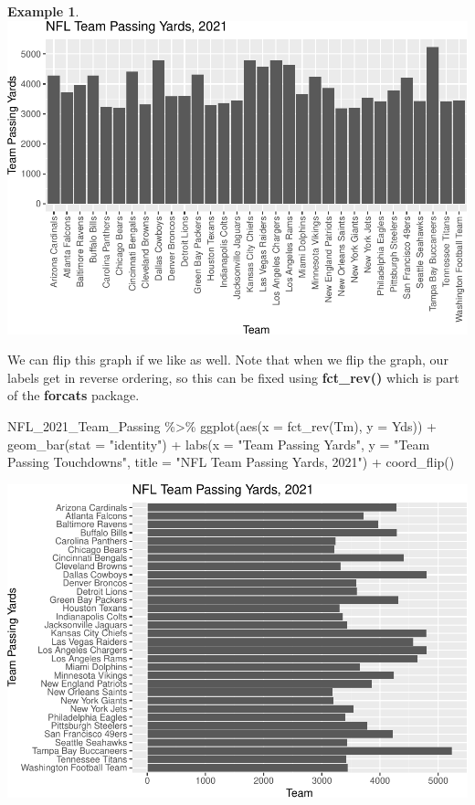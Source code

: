 \documentclass[
  11pt,
]{book}
\newenvironment{Shaded}{\begin{snugshade}}{\end{snugshade}}
\newcommand{\AttributeTok}[1]{\textcolor[rgb]{0.77,0.63,0.00}{#1}}
\newcommand{\FunctionTok}[1]{\textcolor[rgb]{0.00,0.00,0.00}{#1}}
\newcommand{\NormalTok}[1]{#1}
\newcommand{\SpecialCharTok}[1]{\textcolor[rgb]{0.00,0.00,0.00}{#1}}
\newcommand{\StringTok}[1]{\textcolor[rgb]{0.31,0.60,0.02}{#1}}
\theoremstyle{definition}
\theoremstyle{definition}
\newtheorem{example}{Example}[chapter]
\theoremstyle{definition}
\theoremstyle{definition}
\theoremstyle{remark}
\begin{document}
\begin{example}
\includegraphics{series_files/figure-latex/bar2-1.pdf}

We can flip this graph if we like as well. Note that when we flip the graph, our labels get in reverse ordering, so this can be fixed using \textbf{fct\_rev()} which is part of the \textbf{forcats} package.

\begin{Shaded}
\begin{Highlighting}[]
\NormalTok{NFL\_2021\_Team\_Passing }\SpecialCharTok{\%\textgreater{}\%}
    \FunctionTok{ggplot}\NormalTok{(}\FunctionTok{aes}\NormalTok{(}\AttributeTok{x =} \FunctionTok{fct\_rev}\NormalTok{(Tm), }\AttributeTok{y =}\NormalTok{ Yds)) }\SpecialCharTok{+} \FunctionTok{geom\_bar}\NormalTok{(}\AttributeTok{stat =} \StringTok{"identity"}\NormalTok{) }\SpecialCharTok{+} \FunctionTok{labs}\NormalTok{(}\AttributeTok{x =} \StringTok{"Team Passing Yards"}\NormalTok{,}
    \AttributeTok{y =} \StringTok{"Team Passing Touchdowns"}\NormalTok{, }\AttributeTok{title =} \StringTok{"NFL Team Passing Yards, 2021"}\NormalTok{) }\SpecialCharTok{+} \FunctionTok{coord\_flip}\NormalTok{()}
\end{Highlighting}
\end{Shaded}

\includegraphics{series_files/figure-latex/bar3-1.pdf}
\end{example}
\end{document}
